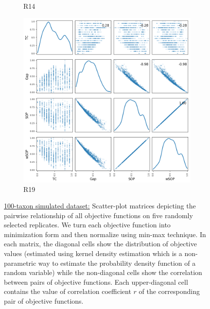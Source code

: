 \begin{figure}[!htbp]
\begin{adjustwidth}{-1cm}{-1cm}
\begin{subfigure}{0.35\textwidth}
			\caption{R14}
		\end{subfigure}
		\begin{subfigure}{0.35\textwidth}
			\includegraphics[width=\columnwidth]{Figure/NumGaps_SOP_TC_wSOP/precomputedInit/R19/fig/scatter_mattrix}
			\caption{R19}
		\end{subfigure}
		\caption[Scatter-plot matrices for four objective functions on 100-taxon simulated dataset]{\underline{100-taxon simulated dataset:} Scatter-plot matrices depicting the pairwise relationship of all objective functions on five randomly selected replicates. We turn each objective function into minimization form and then normalize using min-max technique. In each matrix, the diagonal cells show the distribution of objective values (estimated using kernel density estimation which is a non-parametric way to estimate the probability density function of a random variable) while the non-diagonal cells show the correlation between pairs of objective functions. Each upper-diagonal cell contains the value of correlation coefficient $r$ of the corresponding pair of objective functions.}
		\label{fig:nature_obj}
	\end{adjustwidth}
\end{figure}

